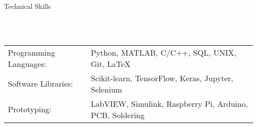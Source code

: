 \documentclass{article}
\newcommand{\lineunder} {
    \vspace*{-8pt} \\
    \hspace*{-18pt} \hrulefill \\
}
\newcommand{\header} [1] {
    {\hspace*{-18pt}\vspace*{6pt} \Large{#1} }
    \vspace*{-6pt} 
    \lineunder
}
\begin{document}

%
\vspace{5mm}

\header{Technical Skills}
\vspace{1mm}
\begin{tabular}{ l l }
	Programming Languages: & Python, MATLAB, C/C++, SQL, UNIX, Git, \LaTeX \\
	Software Libraries:   & Scikit-learn, TensorFlow, Keras, Jupyter, Selenium\\
	Prototyping:    & LabVIEW, Simulink, Raspberry Pi, Arduino, PCB, Soldering  \\
\end{tabular}
\vspace{5mm}


\end{document}
